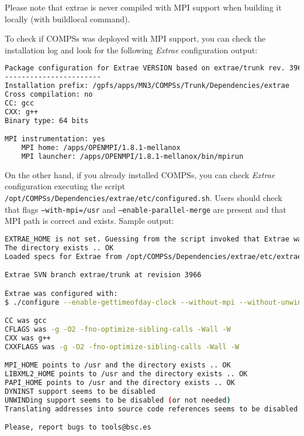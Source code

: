 Please note that extrae is never compiled with MPI support when building it locally (with buildlocal command).

To check if COMPSs was deployed with MPI support, you can check the installation log and look for the following \textit{Extrae} configuration output:

\begin{lstlisting}[language=bash]
Package configuration for Extrae VERSION based on extrae/trunk rev. 3966:
-----------------------
Installation prefix: /gpfs/apps/MN3/COMPSs/Trunk/Dependencies/extrae
Cross compilation: no
CC: gcc
CXX: g++
Binary type: 64 bits

MPI instrumentation: yes
	MPI home: /apps/OPENMPI/1.8.1-mellanox
	MPI launcher: /apps/OPENMPI/1.8.1-mellanox/bin/mpirun
\end{lstlisting}

On the other hand, if you already installed COMPSs, you can check \textit{Extrae} configuration executing the script \texttt{/opt/COMPSs/Dependencies/extrae/etc/configured.sh}. Users should check that flags \texttt{--with-mpi=/usr} and \texttt{--enable-parallel-merge} are present and that MPI path is correct and exists. Sample output:

\begin{lstlisting}[language=bash]
EXTRAE_HOME is not set. Guessing from the script invoked that Extrae was installed in /opt/COMPSs/Dependencies/extrae
The directory exists .. OK
Loaded specs for Extrae from /opt/COMPSs/Dependencies/extrae/etc/extrae-vars.sh

Extrae SVN branch extrae/trunk at revision 3966

Extrae was configured with:
$ ./configure --enable-gettimeofday-clock --without-mpi --without-unwind --without-dyninst --without-binutils --with-mpi=/usr --enable-parallel-merge --with-papi=/usr --with-java-jdk=/usr/lib/jvm/java-7-openjdk-amd64/ --disable-openmp --disable-nanos --disable-smpss --prefix=/opt/COMPSs/Dependencies/extrae --with-mpi=/usr --enable-parallel-merge --libdir=/opt/COMPSs/Dependencies/extrae/lib

CC was gcc
CFLAGS was -g -O2 -fno-optimize-sibling-calls -Wall -W
CXX was g++
CXXFLAGS was -g -O2 -fno-optimize-sibling-calls -Wall -W

MPI_HOME points to /usr and the directory exists .. OK
LIBXML2_HOME points to /usr and the directory exists .. OK
PAPI_HOME points to /usr and the directory exists .. OK
DYNINST support seems to be disabled
UNWINDing support seems to be disabled (or not needed)
Translating addresses into source code references seems to be disabled (or not needed)

Please, report bugs to tools@bsc.es
\end{lstlisting}

